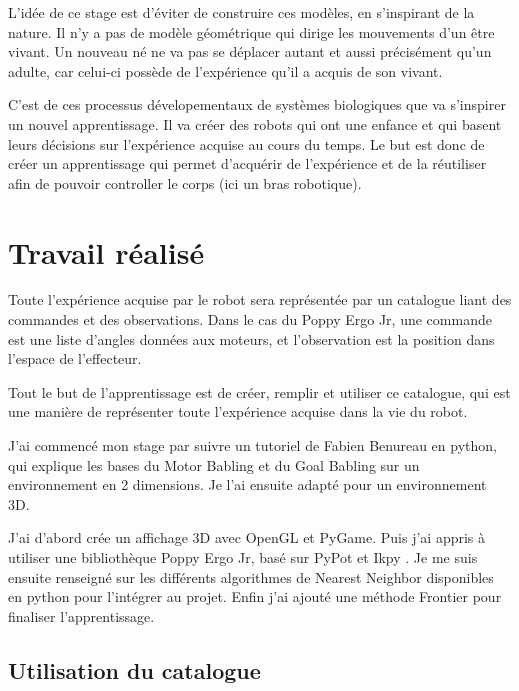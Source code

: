\documentclass[11pt,french]{report}
\begin{document}
\phantom{INVISIBLE LINE}

L'idée de ce stage est d'éviter de construire ces modèles, en s'inspirant de la nature.
Il n'y a pas de modèle géométrique qui dirige les mouvements d'un être vivant.
Un nouveau né ne va pas se déplacer autant et aussi précisément qu'un adulte, car celui-ci possède de l'expérience qu'il a acquis de son vivant.

C'est de ces processus dévelopementaux de systèmes biologiques que va s'inspirer un nouvel apprentissage.
Il va créer des robots qui ont une enfance et qui basent leurs décisions sur l'expérience acquise au cours du temps.
Le but est donc de créer un apprentissage qui permet d'acquérir de l'expérience et de la réutiliser afin de pouvoir controller le corps (ici un bras robotique).

\chapter{Travail réalisé}

Toute l'expérience acquise par le robot sera représentée par un catalogue liant des commandes et des observations.
Dans le cas du Poppy Ergo Jr, une commande est une liste d'angles données aux moteurs, et l'observation est la position dans l'espace de l'effecteur.

Tout le but de l'apprentissage est de créer, remplir et utiliser ce catalogue, qui est une manière de représenter toute l'expérience acquise dans la vie du robot.

\phantom{INVISIBLE LINE}

J'ai commencé mon stage par suivre un tutoriel \cite{TutoGoalBabling} de Fabien Benureau en python, qui explique les bases du Motor Babling et du Goal Babling sur un environnement en 2 dimensions.
Je l'ai ensuite adapté pour un environnement 3D.

J'ai d'abord crée un affichage 3D avec OpenGL et PyGame.
Puis j'ai appris à utiliser une bibliothèque Poppy Ergo Jr, basé sur PyPot \cite{PyPot} et Ikpy \cite{IKPy}.
Je me suis ensuite renseigné sur les différents algorithmes de Nearest Neighbor disponibles en python pour l'intégrer au projet.
Enfin j'ai ajouté une méthode Frontier \cite{Frontier} pour finaliser l'apprentissage.

\pagebreak
\section{Utilisation du catalogue}
\end{document}
